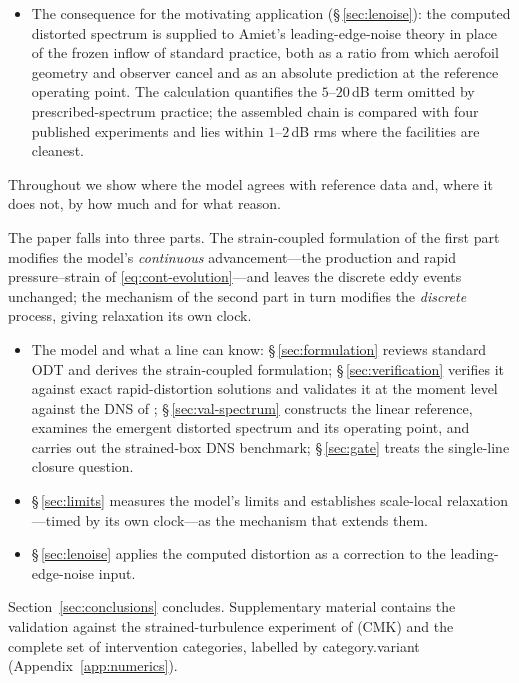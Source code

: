 \documentclass[lineno]{JFM-FLM_Au}
\begin{document}
\begin{itemize}
\item The consequence for the motivating application
(\S\,\ref{sec:lenoise}): the computed distorted spectrum is supplied to
Amiet's leading-edge-noise theory in place of the frozen inflow of standard
practice, both as a ratio from which aerofoil geometry and observer cancel
and as an absolute prediction at the reference operating point. The
calculation quantifies the $5$--$20$\,dB term omitted by prescribed-spectrum
practice; the assembled chain is compared with four published experiments
and lies within $1$--$2$\,dB rms where the facilities are cleanest.
\end{itemize}
Throughout we show where the model agrees with reference data and, where it
does not, by how much and for what reason.


The paper falls into three parts. The strain-coupled formulation of the
first part modifies the model's \emph{continuous} advancement---the
production and rapid pressure--strain of \eqref{eq:cont-evolution}---and
leaves the discrete eddy events unchanged; the mechanism of the second
part in turn modifies the \emph{discrete} process, giving relaxation its
own clock.
\begin{itemize}
\item The model and what a line can know: \S\,\ref{sec:formulation}
reviews standard ODT and derives the strain-coupled formulation;
\S\,\ref{sec:verification} verifies it against exact rapid-distortion
solutions and validates it at the moment level against the DNS of
\citet{LeeReynolds1985}; \S\,\ref{sec:val-spectrum} constructs the linear
reference, examines the emergent distorted spectrum and its operating
point, and carries out the strained-box DNS benchmark; \S\,\ref{sec:gate}
treats the single-line closure question.

\item \S\,\ref{sec:limits} measures the model's limits and establishes
scale-local relaxation---timed by its own clock---as the mechanism that
extends them.

\item \S\,\ref{sec:lenoise} applies the computed distortion as a
correction to the leading-edge-noise input.
\end{itemize}
Section~\ref{sec:conclusions} concludes. Supplementary material contains
the validation against the strained-turbulence experiment of
\citet{ChenMeneveauKatz2006} (CMK) and the complete set of intervention categories, labelled by category.variant (Appendix~\ref{app:numerics}).
\end{document}
